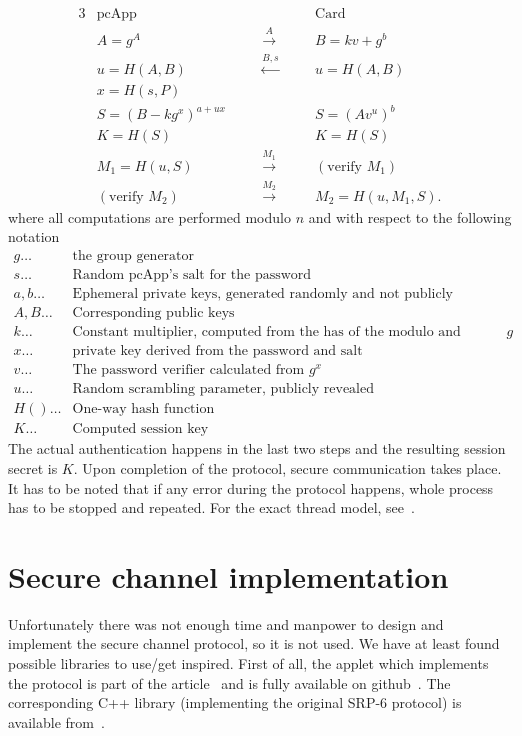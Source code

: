 \documentclass[12pt,a4paper]{article}
\begin{document}
\begin{alignat*}{3}
& \textrm{pcApp} \quad &&                                                         && \quad \textrm{Card} \\
& A = g^A && \quad \xrightarrow{A} && \quad B = kv + g^b \\
& u = H(A,B) && \quad \xleftarrow{B,s} && \quad u = H(A,B) \\
& x = H(s,P) && && \\
& S = (B - kg^x)^{a + ux} && && \quad S = (Av^u)^b \\
& K = H(S) && && \quad K = H(S) \\
& M_1 = H(u,S) && \quad \xrightarrow{M_1} && \quad (\textrm{verify } M_1) \\
& (\textrm{verify } M_2) && \quad \xrightarrow{M_2} && \quad M_2 = H(u, M_1, S).
\end{alignat*}
where all computations are performed modulo $n$ and with respect to the following notation
\begin{align*}
g \dots & \textrm{the group generator} \\
s \dots & \textrm{Random pcApp's salt for the password} \\
a, b \dots & \textrm{Ephemeral private keys, generated randomly and not publicly revealed} \\
A, B \dots & \textrm{Corresponding public keys} \\
k \dots & \textrm{Constant multiplier, computed from the has of the modulo and concatenated with } g \\
x \dots & \textrm{private key derived from the password and salt} \\
v \dots & \textrm{The password verifier calculated from } g^x \\
u \dots & \textrm{Random scrambling parameter, publicly revealed} \\
H() \dots & \textrm{One-way hash function} \\
K \dots & \textrm{Computed session key}
\end{align*}
The actual authentication happens in the last two steps and the resulting session secret is $K$. Upon completion of the protocol, secure communication takes place. It has to be noted that if any error during the protocol happens, whole process has to be stopped and repeated. For the exact thread model, see~\cite{srpjava}.

\section*{Secure channel implementation}
Unfortunately there was not enough time and manpower to design and implement the secure channel protocol, so it is not used. We have at least found possible libraries to use/get inspired. First of all, the applet which implements the protocol is part of the article~\cite{srpjava} and is fully available on github~\cite{appletgit}. The corresponding C++ library (implementing the original SRP-6 protocol) is available from~\cite{library}.
\end{document}

